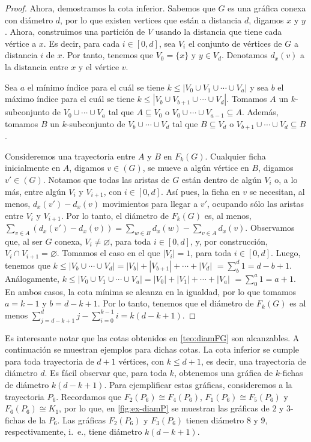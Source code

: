 \begin{proof}
    Ahora, demostramos la cota inferior. Sabemos que $G$ es una gr\'afica conexa
    con di\'ametro $d$, por lo que existen vertices que est\'an a distancia $d$,
    digamos $x$ y $y$. Ahora, construimos una partici\'on de $V$ usando la
    distancia que tiene cada v\'ertice a $x$. Es decir, para cada $i\in [0,d]$,
    sea $V_{i}$ el conjunto de v\'ertices de $G$ a distancia $i$ de $x$. Por
    tanto, tenemos que $V_{0}=\{x\}$ y $y\in V_{d}$. Denotamos $d_x(v)$ a la
    distancia entre $x$ y el v\'ertice $v$.

    Sea $a$ el m\'inimo \'indice para el cu\'al se tiene $k \leq |V_{0}\cup
    V_{1}\cup \cdots \cup V_{a}|$ y sea $b$ el m\'aximo \'indice para el cu\'al
    se tiene $k\leq |V_{b}\cup V_{b+1}\cup \cdots \cup V_{d}|$. Tomamos $A$ un
    $k$-subconjunto de $V_{0}\cup \cdots \cup V_{a}$  tal que $A\subseteq V_{0}$
    o $V_{0}\cup \cdots \cup V_{a-1}\subseteq A$. Adem\'as, tomamos $B$ un
    $k$-subconjunto de $V_{b}\cup \cdots \cup V_{d}$ tal que $B\subseteq V_{d}$
    o $V_{b+1}\cup \cdots \cup V_{d} \subseteq B$. 

    Consideremos una trayectoria entre $A$ y $B$ en $F_{k}(G)$. Cualquier ficha
    inicialmente en $A$, digamos $v \in (G)$, se mueve a alg\'un v\'ertice en
    $B$, digamos $v'\in (G)$. Notamos que todas las aristas de $G$ est\'an
    dentro de alg\'un $V_{i}$ o, a lo m\'as, entre alg\'un $V_{i}$ y $V_{i+1}$,
    con $i\in[0,d]$. As\'i pues, la ficha en $v$ se necesitan, al menos,
    $d_x(v')-d_x(v)$ movimientos para llegar a $v'$, ocupando s\'olo las aristas
    entre $V_{i}$ y $V_{i+1}$. Por lo tanto, el di\'ametro de $F_{k}(G)$ es, al
    menos, $\sum_{v\in A}(d_x(v')-d_x(v))= \sum_{w\in B}d_x(w)-\sum_{v\in
    A}d_x(v)$. Observamos que, al ser $G$ conexa, $V_{i} \neq \varnothing$, para
    toda $i\in [0,d]$, y, por construcci\'on, $V_{i} \cap V_{i+1}=\varnothing$.
    Tomamos el caso en el que $|V_{i}|=1$, para toda $i\in [0,d]$. Luego,
    tenemos que $k\leq |V_{b}\cup\cdots\cup V_{d}|=|V_{b}|+|V_{b+1}|+\cdots
    +|V_d|$ $=\sum_{b}^{d}1 = d -b+1$. An\'alogamente, $k\leq |V_{0}\cup
    V_{1}\cup \cdots \cup V_{a}|=|V_{0}|+|V_{1}|+\cdots + |V_{a}|$
    $=\sum_{0}^{a} 1 = a+1$. En ambos casos, la cota m\'inima se alcanza en la
    igualdad, por lo que tomamos $a=k-1$ y $b=d-k+1$. Por lo tanto, tenemos que
    el di\'ametro de $F_{k}(G)$ es al menos $\sum_{j=d -k+1}^{d}j -
    \sum_{i=0}^{k-1}i = k(d-k+1)$.
\end{proof}

Es interesante notar que las cotas obtenidos en \cref{teo:diamFG} son
alcanzables. A continuaci\'on se muestran ejemplos para dichas cotas. La cota
inferior se cumple para toda trayectoria de $d +1$ v\'ertices, con $k \leq d
+1$, es decir, una trayectoria de di\'ametro $d$. Es f\'acil observar que, para
toda $k$, obtenemos una gr\'afica de $k$-fichas de di\'ametro $k(d-k+1)$. Para
ejemplificar estas gr\'aficas, consideremos a la trayectoria $P_6$. Recordamos
que $F_2(P_6) \cong F_4(P_6)$, $F_1(P_6) \cong F_5(P_6)$ y $F_6(P_6) \cong K_1$,
por lo que, en \cref{fig:ex-diamP} se muestran las gr\'aficas de $2$ y
$3$-fichas de la $P_6$. Las gr\'aficas $F_2(P_6)$ y $F_3(P_6)$ tienen di\'ametro
$8$ y $9$, respectivamente, i.~e., tiene di\'ametro $k(d-k+1)$.

